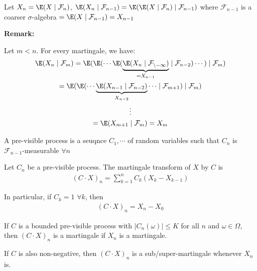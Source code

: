 \noindent Let $X_n = \E(X\mid \mathcal{F}_n)$, $\E(X_n\mid\mathcal{F}_{n-1}) = \E(\E(X\mid\mathcal{F}_n)\mid\mathcal{F}_{n-1})$ where $\mathcal{F}_{n-1}$ is a coarser $\sigma$-algebra $= \E(X\mid\mathcal{F}_{n-1}) = X_{n-1}$
\par\bigskip
\noindent\textbf{Remark:}\par
\noindent Let $m<n$. For every martingale, we have:
\begin{equation*}
  \begin{gathered}
    \E(X_n\mid\mathcal{F}_m) = \E(\E(\cdots\E(\underbrace{\E(X_n\mid\mathcal{F_{n-1}})}_{=X_{n-1}}\mid\mathcal{F}_{n-2})\cdots)\mid\mathcal{F}_m)\\
    =\E(\E(\cdots\underbrace{\E(X_{n-1}\mid\mathcal{F}_{n-2})}_{X_{n-2}}\cdots\mid\mathcal{F}_{m+1})\mid\mathcal{F}_m)\\
    \vdots\\
    =\E(X_{m+1}\mid\mathcal{F}_m) = X_m
  \end{gathered}
\end{equation*}
\par\bigskip
\begin{defo}{}
  A pre-visible process is a seuqnce $C_1,\cdots$ of random variables such that $C_n$ is $\mathcal{F}_{n-1}$-measurable $\forall n$
\end{defo}
\par\bigskip
\noindent Let $C_n$ be a pre-visible process. The martingale transform of $X$ by $C$ is 
\begin{equation*}
  \begin{gathered}
    (C\cdot X)_n = \sum_{k=1}^{n}C_k(X_k-X_{k-1})
  \end{gathered}
\end{equation*}\par
\noindent In particular, if $C_k = 1$ $\forall k$, then
\begin{equation*}
  \begin{gathered}
    (C\cdot X)_n = X_n-X_0
  \end{gathered}
\end{equation*}
\par\bigskip
\begin{defo}[]{}
  If $C$ is a bounded pre-visible process with $\left|C_n(\omega)\right|\leq K$ for all $n$ and $\omega\in\Omega$, then $(C\cdot X)_n$ is a martingale if $X_n$ is a martingale.
  \par\bigskip
  \noindent If $C$ is also non-negative, then $(C\cdot X)_n$ is a sub/super-martingale whenever $X_n$ is.
\end{defo}
